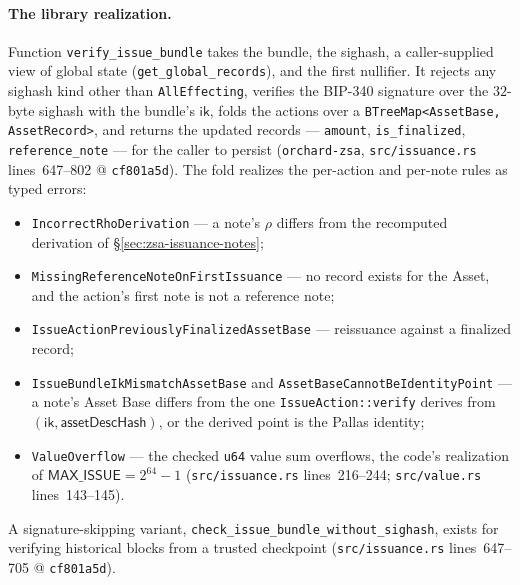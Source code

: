 \documentclass[11pt,a4paper]{article}
\theoremstyle{definition}
\begin{document}
\paragraph{The library realization.} Function
\texttt{verify\_issue\_bundle} takes the bundle, the sighash, a
caller-supplied view of global state (\texttt{get\_global\_records}),
and the first nullifier. It rejects any sighash kind other than
\texttt{AllEffecting}, verifies the BIP-340 signature over the $32$-byte
sighash with the bundle's $\mathsf{ik}$, folds the actions over a
\texttt{BTreeMap<AssetBase, AssetRecord>}, and returns the updated
records --- \texttt{amount}, \texttt{is\_finalized},
\texttt{reference\_note} --- for the caller to persist
(\texttt{orchard-zsa}, \texttt{src/issuance.rs} lines~647--802 @
\texttt{cf801a5d}). The fold realizes the per-action and per-note rules
as typed errors:
\begin{itemize}
\item \texttt{IncorrectRhoDerivation} --- a note's $\rho$ differs from
  the recomputed derivation of \S\ref{sec:zsa-issuance-notes};
\item \texttt{MissingReferenceNoteOnFirstIssuance} --- no record exists
  for the Asset, and the action's first note is not a reference note;
\item \texttt{IssueActionPreviouslyFinalizedAssetBase} --- reissuance
  against a finalized record;
\item \texttt{IssueBundleIkMismatchAssetBase} and
  \texttt{AssetBaseCannotBeIdentityPoint} --- a note's Asset Base
  differs from the one \texttt{IssueAction::verify} derives from
  $(\mathsf{ik}, \mathsf{assetDescHash})$, or the derived point is the
  Pallas identity;
\item \texttt{ValueOverflow} --- the checked \texttt{u64} value sum
  overflows, the code's realization of $\mathsf{MAX\_ISSUE} = 2^{64}-1$
  (\texttt{src/issuance.rs} lines~216--244; \texttt{src/value.rs}
  lines~143--145).
\end{itemize}
A signature-skipping variant,
\texttt{check\_issue\_bundle\_without\_sighash}, exists for verifying
historical blocks from a trusted checkpoint (\texttt{src/issuance.rs}
lines~647--705 @ \texttt{cf801a5d}).
\end{document}
